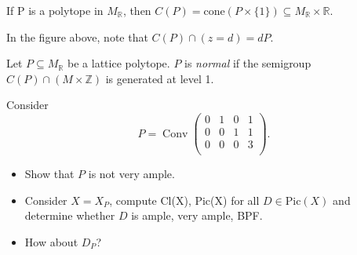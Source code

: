 \documentclass[a4paper,12pt]{amsart}
\DeclareMathOperator{\Conv}{Conv}
\begin{document}
\begin{remark}
	If P is a polytope in $M_\mathbb{R}$, then $ C(P) = \text{cone}(P \times \{1\}) \subseteq M_\mathbb{R} \times \mathbb{R}$.
\end{remark}

In the figure above, note that $C(P) \cap (z=d) = dP$.

\begin{definition}
	Let $P \subseteq M_\mathbb{R}$ be a lattice polytope. $P$ is \textit{normal} if the semigroup $C(P) \cap (M \times \mathbb{Z})$ is generated at level 1.
\end{definition}

\begin{exercise}
	Consider
	\begin{equation}
		P = \Conv \begin{pmatrix}
		0 & 1 & 0 & 1\\
		0 & 0 & 1 & 1\\
		0 & 0 & 0 & 3\\
		\end{pmatrix}.
	\end{equation}
	\begin{itemize}
		\item Show that $P$ is not very ample.
		\item Consider $X = X_P$, compute Cl(X), Pic(X) for all $D \in \text{Pic}(X)$ and determine whether $D$ is ample, very ample, BPF.
		\item How about $D_P$?
	\end{itemize}
\end{exercise}
\end{document}
